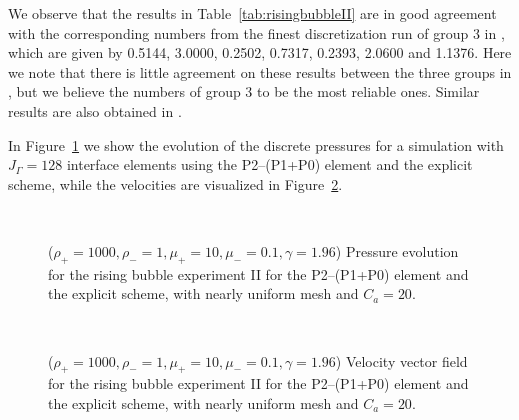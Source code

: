 We observe that the results in Table~\ref{tab:risingbubbleII}
are in good agreement with the corresponding numbers from the finest
discretization run of group 3 in \cite{HysingTKPBGT09}, which are given by
0.5144, 3.0000, 0.2502, 0.7317, 0.2393, 2.0600 and 1.1376. Here we note that
there is little agreement on these results between the three groups in
\cite{HysingTKPBGT09}, but we believe the numbers of group 3 to be the most
reliable ones. Similar results are also obtained in \cite{fluidfbp}.

In Figure~\ref{fig:risingbubbleIIpressure} we show the evolution of the discrete
pressures for a simulation with $J_\Gamma=128$ interface elements using the
P2--(P1+P0) element and the explicit scheme, while the velocities are visualized
in Figure~\ref{fig:risingbubbleIIvelocity}.
\begin{figure}[htbp]
\centering
{}
\\
\caption[Navier--Stokes rising bubble II pressure]
{($\rho_+ = 1000,\rho_- = 1,\mu_+ = 10,\mu_- =0.1,\gamma = 1.96$)
Pressure evolution for the rising bubble experiment II for the P2--(P1+P0)
element and the explicit scheme, with nearly uniform mesh and
$C_a=20$\textdegree.}
\label{fig:risingbubbleIIpressure}
\end{figure}

\begin{figure}[htbp]
\centering
{}
\\
\caption[Navier--Stokes rising bubble II velocity]
{($\rho_+ = 1000,\rho_- = 1,\mu_+ = 10,\mu_- =0.1,\gamma = 1.96$)
Velocity vector field for the rising bubble experiment II for the P2--(P1+P0)
element and the explicit scheme, with nearly uniform mesh and
$C_a=20$\textdegree.}
\label{fig:risingbubbleIIvelocity}
\end{figure}

